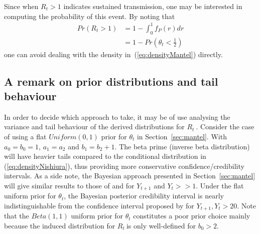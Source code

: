 \documentclass[12pt]{article}
\def \rr {$R_{t}\ $}
\begin{document}
Since when $R_t > 1$ indicates sustained transmission, one may be interested in computing the probability of this event.
By noting that
\begin{align}
\label{cumprobMantel}
Pr(R_t > 1) &= 1 - \int_0^1 f_P(r)dr \\
            &= 1- Pr(\theta_t < \frac{1}{2})
\end{align}
one can avoid dealing with the density in~(\ref{eq:densityMantel}) directly.

% 

\subsection{A remark on prior distributions and tail behaviour}
\label{sec:tails}

In order to decide which approach to take, it may be of use analysing the variance and tail behaviour of the derived distributions for \rr. 
Consider the case of using a flat $Uniform(0, 1)$ prior for $\theta_t$ in Section~\ref{sec:mantel}.
With $a_0 = b_0 = 1$, $a_1 = a_2$ and $b_1 = b_2 + 1$.
The beta prime (inverse beta distribution) will have heavier tails compared to the conditional distribution in (\ref{eq:densityNishiura}), thus providing more conservative confidence/credibility intervals.  
As a side note, the Bayesian approach presented in Section~\ref{sec:mantel} will give similar results to those of \citet{wilson} and \citet{wilson} for $Y_{t+1}$ and $Y_t >> 1$.
Under the flat  uniform prior for $\theta_t$, the Bayesian posterior credibility interval is nearly indistinguishable from the confidence interval proposed by \citet{clopper} for $Y_{t+1}, Y_t > 20$.
Note that the $Beta(1, 1)$ uniform prior for $\theta_t$ constitutes a poor prior choice mainly because the induced distribution for \rr is only well-defined for $b_0 > 2$.
\end{document}
